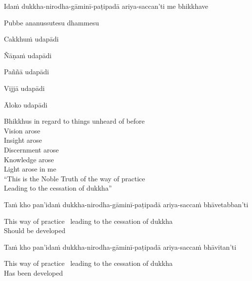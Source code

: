 \begin{pali-hang-firstline}
  Idaṁ dukkha-nirodha-gāminī-paṭipadā ariya-saccan'ti me bhikkhave
\end{pali-hang-firstline}
\begin{pali-hangtogether}
  Pubbe ananussutesu dhammesu
\end{pali-hangtogether}
\begin{pali-hangtogether}
  Cakkhuṁ udapādi
\end{pali-hangtogether}
\begin{pali-hangtogether}
  Ñāṇaṁ udapādi
\end{pali-hangtogether}
\begin{pali-hangtogether}
  Paññā udapādi
\end{pali-hangtogether}
\begin{pali-hangtogether}
  Vijjā udapādi
\end{pali-hangtogether}
\begin{pali-hangtogether}
  Āloko udapādi
\end{pali-hangtogether}

\begin{english-verses}
  Bhikkhus in regard to things unheard of before\\
  Vision arose\\
  Insight arose\\
  Discernment arose\\
  Knowledge arose\\
  Light arose in me\\
  ``This is the Noble Truth of the way of practice\\
  Leading to the cessation of dukkha''
\end{english-verses}

\begin{pali-hang}
  Taṁ kho pan'idaṁ dukkha-nirodha-gāminī-paṭipadā ariya-saccaṁ bhāvetabban'ti
\end{pali-hang}

\begin{english}
  This way of practice \breathmark\ leading to the cessation of dukkha\\
  Should be developed
\end{english}

\begin{pali-hang}
  Taṁ kho pan'idaṁ dukkha-nirodha-gāminī-paṭipadā ariya-saccaṁ bhāvitan'ti
\end{pali-hang}

\begin{english}
  This way of practice \breathmark\ leading to the cessation of dukkha\\
  Has been developed
\end{english}

